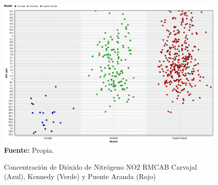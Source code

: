 \documentclass[a4paper,openright,12pt]{book}
\theoremstyle{definition}
\theoremstyle{remark}
\begin{document}
\begin{figure}[h]
\centering
\caption{Concentración de Dióxido de Nitrógeno NO2 RMCAB Carvajal (Azul), Kennedy (Verde) y Puente Aranda (Rojo)} 
\includegraphics[scale=0.4]{RMCABanalisis/AnalisisRMCABNO2}
\label{fig:Tabla1}
\\ \textbf{Fuente: }Propia.
\end{figure}
\end{document}
